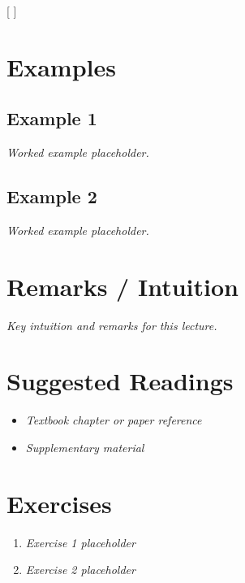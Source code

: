 \documentclass[
  letterpaper,
  DIV=11,
  numbers=noendperiod]{scrartcl}
\providecommand{\tightlist}{%
  \setlength{\itemsep}{0pt}\setlength{\parskip}{0pt}}
\begin{document}
{[}  {]}

\section{Examples}\label{examples}

\subsection{Example 1}\label{example-1}

\emph{Worked example placeholder.}

\subsection{Example 2}\label{example-2}

\emph{Worked example placeholder.}

\section{Remarks / Intuition}\label{remarks-intuition}

\begin{tcolorbox}[enhanced jigsaw, title=\textcolor{quarto-callout-note-color}{\faInfo}\hspace{0.5em}{Note}, bottomrule=.15mm, opacitybacktitle=0.6, leftrule=.75mm, toptitle=1mm, colframe=quarto-callout-note-color-frame, left=2mm, opacityback=0, coltitle=black, titlerule=0mm, colback=white, arc=.35mm, toprule=.15mm, breakable, rightrule=.15mm, bottomtitle=1mm, colbacktitle=quarto-callout-note-color!10!white]

\emph{Key intuition and remarks for this lecture.}

\end{tcolorbox}

\section{Suggested Readings}\label{suggested-readings}

\begin{itemize}
\tightlist
\item
  \emph{Textbook chapter or paper reference}
\item
  \emph{Supplementary material}
\end{itemize}

\section{Exercises}\label{exercises}

\begin{enumerate}
\def\labelenumi{\arabic{enumi}.}
\tightlist
\item
  \emph{Exercise 1 placeholder}
\item
  \emph{Exercise 2 placeholder}
\end{enumerate}
\end{document}
